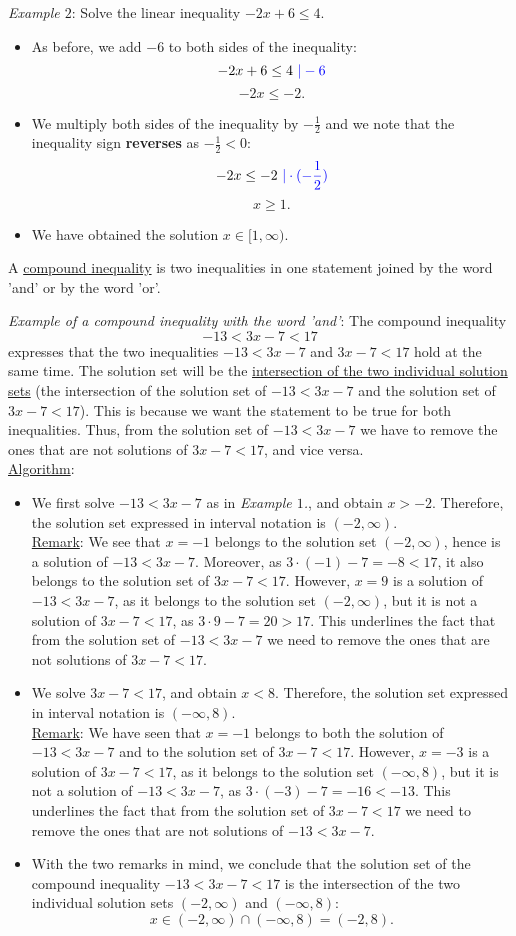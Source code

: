 \documentclass[12pt]{article}
\begin{document}
\textit{Example $2$}: Solve the linear inequality $-2x+6\leq 4$.
\begin{itemize}
\item As before, we add $-6$ to both sides of the inequality:
$$-2x+6\leq 4 \textcolor{blue}{\ |-6}$$
$$-2x\leq -2.$$
\item We multiply both sides of the inequality by $-\frac{1}{2}$ and we note that the inequality sign \textbf{reverses} as $-\frac{1}{2}<0$:
$$-2x\leq -2 \textcolor{blue}{\ |\cdot (-\frac{1}{2})}$$
$$x\geq 1.$$
\item We have obtained the solution $x\in [1, \infty)$.
\end{itemize}

A \underline{compound inequality} is two inequalities in one statement joined by the word 'and' or by the word 'or'. 

\textit{Example of a compound inequality with the word 'and'}: The compound inequality 
$$-13<3x-7<17$$
expresses that the two inequalities $-13<3x-7$ and $3x-7<17$ hold at the same time. The solution set will be the \underline{intersection of the two individual solution sets} (the intersection of the solution set of $-13<3x-7$ and the solution set of $3x-7<17$). This is because we want the statement to be true for both inequalities. Thus, from the solution set of $-13<3x-7$ we have to remove the ones that are not solutions of $3x-7<17$, and vice versa. \\
\underline{Algorithm}:
\begin{itemize}
\item We first solve $-13<3x-7$ as in \textit{Example $1$.}, and obtain $x>-2$. Therefore, the solution set expressed in interval notation is $(-2, \infty)$.\\
\underline{Remark}: We see that $x=-1$ belongs to the solution set $(-2, \infty)$, hence is a solution of $-13<3x-7$. Moreover, as $3\cdot (-1)-7=-8<17$, it also belongs to the solution set of $3x-7<17$. However, $x=9$ is a solution of $-13<3x-7$, as it belongs to the solution set $(-2, \infty)$, but it is not a solution of $3x-7<17$, as $3\cdot 9-7=20>17$. This underlines the fact that from the solution set of $-13<3x-7$ we need to remove the ones that are not solutions of $3x-7<17$.
\item We solve $3x-7<17$, and obtain $x<8$. Therefore, the solution set expressed in interval notation is $(-\infty, 8)$.\\
\underline{Remark}: We have seen that $x=-1$ belongs to both the solution of $-13<3x-7$ and to the solution set of $3x-7<17$. However, $x=-3$ is a solution of $3x-7<17$, as it belongs to the solution set $ (-\infty, 8)$, but it is not a solution of $-13<3x-7$, as $3\cdot (-3)-7=-16<-13$. This underlines the fact that from the solution set of $3x-7<17$ we need to remove the ones that are not solutions of $-13<3x-7$.
\item With the two remarks in mind, we conclude that the solution set of the compound inequality $-13<3x-7<17$ is the intersection of the two individual solution sets $(-2, \infty)$ and $(-\infty, 8)$: 
$$x\in (-2, \infty) \cap  (-\infty, 8)=(-2, 8).$$
\end{itemize}
\end{document}
